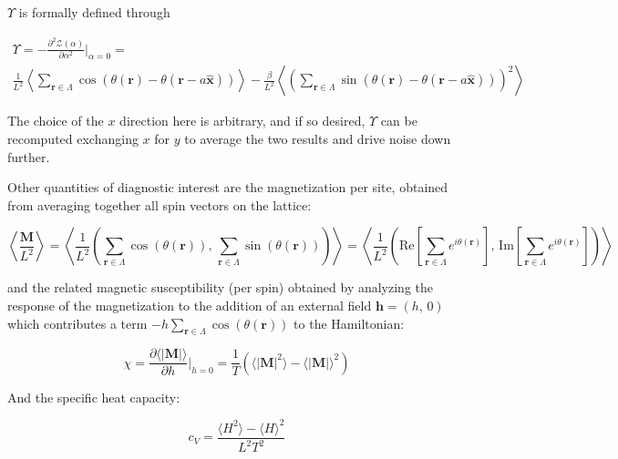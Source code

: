 \documentclass[12pt]{article}
\begin{document}
$\Upsilon$ is formally defined through

\begin{multline} \label{eq:helicity}
	\Upsilon = -\frac{\partial^2\mathcal{Z}(\alpha)}{\partial\alpha^2}\Big|_{\alpha=0} = \\ \frac{1}{L^2} \left\langle \sum_{\mathbf{r}\in\Lambda} \cos(\theta(\mathbf{r})-\theta(\mathbf{r}-a\hat{\mathbf{x}}))
	\right\rangle - \frac{\beta}{L^2} \left\langle \left( \sum_{\mathbf{r}\in\Lambda} \sin(\theta(\mathbf{r})-\theta(\mathbf{r}-a\hat{\mathbf{x}})) \right)^2 \right\rangle
\end{multline}

The choice of the $x$ direction here is arbitrary, and if so desired, $\Upsilon$ can be recomputed exchanging $x$ for $y$ to average the two results
and drive noise down further.

Other quantities of diagnostic interest are the magnetization per site, obtained from averaging together all spin vectors on the lattice:

\begin{equation*}
	\left\langle \frac{\mathbf{M}}{L^2} \right\rangle = \left\langle \frac{1}{L^2} \left( \sum_{\mathbf{r}\in\Lambda} \cos(\theta(\mathbf{r})) ,\,  \sum_{\mathbf{r}\in\Lambda} \sin(\theta(\mathbf{r})) \right) \right\rangle =
	\left\langle \frac{1}{L^2} \left( \mathrm{Re}\left[\sum_{\mathbf{r}\in\Lambda}e^{i\theta(\mathbf{r})} \right],\, \mathrm{Im}\left[ \sum_{\mathbf{r}\in\Lambda} e^{i\theta(\mathbf{r})}\right] \right) \right\rangle
\end{equation*}

and the related magnetic susceptibility (per spin) obtained by analyzing the response of the magnetization to the addition of an external field $\mathbf{h}=(h,\,0)$ which contributes 
a term $-h \sum_{\mathbf{r}\in \Lambda}\cos(\theta(\mathbf{r}))$ to the Hamiltonian:

\begin{equation} \label{eq:susc}
	\chi = \frac{\partial \langle|\mathbf{M}|\rangle}{\partial h}\big|_{h=0} = \frac{1}{T} \left( \langle |\mathbf{M}|^2 \rangle - \langle |\mathbf{M}| \rangle^2 \right)
\end{equation}

And the specific heat capacity:

\begin{equation} \label{eq:heat}
	c_V = \frac{\langle H^2 \rangle - \langle H \rangle^2}{L^2 T^2}
\end{equation}
\end{document}
